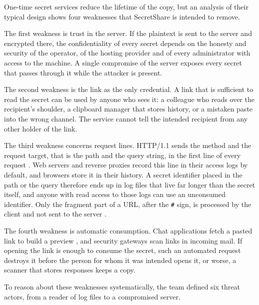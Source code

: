 \documentclass[12pt,a4paper]{article}
\numberwithin{equation}{section}
\numberwithin{figure}{section}
\numberwithin{table}{section}
\begin{document}
One-time secret services reduce the lifetime of the copy, but an analysis of their typical design shows four weaknesses that SecretShare is intended to remove.

The first weakness is trust in the server. If the plaintext is sent to the server and encrypted there, the confidentiality of every secret depends on the honesty and security of the operator, of the hosting provider and of every administrator with access to the machine. A single compromise of the server exposes every secret that passes through it while the attacker is present.

The second weakness is the link as the only credential. A link that is sufficient to read the secret can be used by anyone who sees it: a colleague who reads over the recipient's shoulder, a clipboard manager that stores history, or a mistaken paste into the wrong channel. The service cannot tell the intended recipient from any other holder of the link.

The third weakness concerns request lines. HTTP/1.1 sends the method and the request target, that is the path and the query string, in the first line of every request \cite{rfc9112}. Web servers and reverse proxies record this line in their access logs by default, and browsers store it in their history. A secret identifier placed in the path or the query therefore ends up in log files that live far longer than the secret itself, and anyone with read access to those logs can use an unconsumed identifier. Only the fragment part of a URL, after the \texttt{\#} sign, is processed by the client and not sent to the server \cite{rfc3986}.

The fourth weakness is automatic consumption. Chat applications fetch a pasted link to build a preview \cite{slackunfurl}, and security gateways scan links in incoming mail. If opening the link is enough to consume the secret, such an automated request destroys it before the person for whom it was intended opens it, or worse, a scanner that stores responses keeps a copy.

To reason about these weaknesses systematically, the team defined six threat actors, from a reader of log files to a compromised server.
\end{document}
